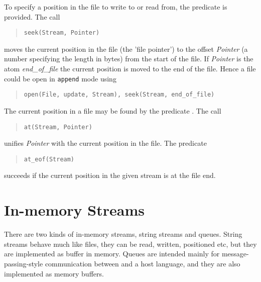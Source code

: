 To specify a position in the file
to write to or read from, the predicate  is provided. The
call \begin{quote}\begin{verbatim}
seek(Stream, Pointer)\end{verbatim}\end{quote} moves the current position in the
file (the 'file pointer') to the offset {\it Pointer} (a number specifying
the length in bytes) from
the start of the file.
If {\it Pointer} is the atom {\it end_of_file} the
current position is moved to the end of the file.
Hence a file could be open in {\tt append} mode using
\begin{quote}\begin{verbatim}
open(File, update, Stream), seek(Stream, end_of_file)\end{verbatim}\end{quote}
The current position in a file may be found by the predicate .
The call \begin{quote}\begin{verbatim}
at(Stream, Pointer)\end{verbatim}\end{quote} unifies {\it Pointer} with the current
position in the file.
The predicate
\begin{quote}\begin{verbatim}
at_eof(Stream)\end{verbatim}\end{quote}
succeeds if the current position in the given stream
is at the file end.


\section{In-memory Streams}
There are two kinds of in-memory streams, string streams and queues.
String streams behave much like files, they can be read, written,
positioned etc, but they are implemented as buffer in memory.
Queues are intended mainly for message-passing-style communication
between \eclipse and a host language, and they are also implemented as
memory buffers.

